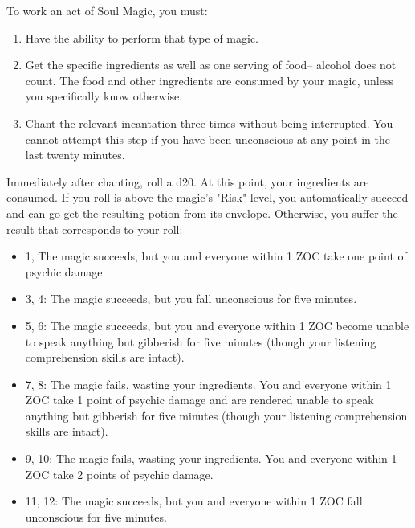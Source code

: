 \documentclass[green]{Kos}
\begin{document}
\name{\gButlerSoulMagic{}}


To work an act of Soul Magic, you must:

\begin{enumerate} 
\item Have the ability to perform that type of magic.
\item Get the specific ingredients as well as one serving of food-- alcohol does not count. The food and other ingredients are consumed by your magic, unless you specifically know otherwise.
\item Chant the relevant incantation three times without being interrupted. You cannot attempt this step if you have been unconscious at any point in the last twenty minutes.
\end{enumerate}

Immediately after chanting, roll a d20. At this point, your ingredients are consumed. If you roll is above the magic's "Risk" level, you automatically succeed and can go get the resulting potion from its envelope. Otherwise, you suffer the result that corresponds to your roll:

\begin{itemize}
\item 1,  The magic succeeds, but you and everyone within 1 ZOC take one point of psychic damage.
\item 3, 4: The magic succeeds, but you fall unconscious for five minutes.
\item 5, 6: The magic succeeds, but you and everyone within 1 ZOC become unable to speak anything but gibberish for five minutes (though your listening comprehension skills are intact).
\item 7, 8: The magic fails, wasting your ingredients.  You and everyone within 1 ZOC take 1 point of psychic damage and are rendered unable to speak anything but gibberish for five minutes (though your listening comprehension skills are intact).
\item 9, 10: The magic fails, wasting your ingredients. You and everyone within 1 ZOC take 2 points of psychic damage.
\item 11, 12: The magic succeeds, but you and everyone within 1 ZOC fall unconscious for five minutes.
\end{itemize}
\end{document}
